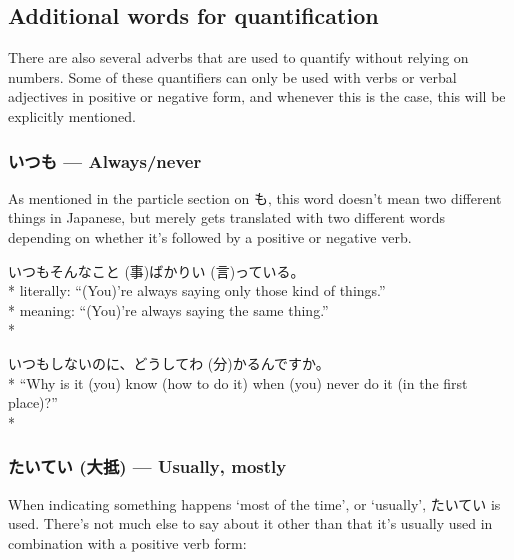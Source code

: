 \documentclass[11pt, b5paper, twoside, openright, onecolumn]{book}
\makeatletter
\newcommand*{\rubystack}[2]{{\relscale{0.5}%
  \begin{tabular}[b]{@{}c@{}}%
    {#1}\\%
   {\textscale{2}{#2}}%
  \end{tabular}}%
}
\DeclareRobustCommand*{\ruby}[2]{%
  \mbox{%
    \setlength{\parskip}{0ex}%
    \BeginAccSupp{method=pdfstringdef,ActualText={#1}}%
      \rubystack{\phantom{#2}}{#1}%
      \llap{%
        \rubystack{#2}{\phantom{#1}}%
      }%
    \EndAccSupp{}%
  }%
}
\renewcommand*{\ruby}[2]{#2 (#1)}%
\newenvironment{exampleblock}{
\setlength{\parindent}{0.6in}
\begin{minipage}[t]{\dimexpr\textwidth-\parindent}}
{\end{minipage}}
\makeatother
\begin{document}
\subsection{Additional words for quantification}

There are also several adverbs that are used to quantify without relying on numbers. Some of these quantifiers can only be used with verbs or verbal adjectives in positive or negative form‚ and whenever this is the case‚ this will be explicitly mentioned.

\subsubsection{いつも — Always/never}

As mentioned in the particle section on も‚ this word doesn’t mean two different things in Japanese‚ but merely gets translated with two different words depending on whether it’s followed by a positive or negative verb.

\vspace{0.4cm}
\begin{exampleblock}
いつもそんな\ruby{事}{こと}ばかり\ruby{言}{い}っている。 \\* 
literally: “(You)’re always saying only those kind of things.” \\* 
meaning: “(You)’re always saying the same thing.” \\* 
\end{exampleblock}
\vspace{0.2cm}

\begin{exampleblock}
いつもしないのに、どうして\ruby{分}{わ}かるんですか。 \\* 
“Why is it (you) know (how to do it) when (you) never do it (in the first place)?” \\* 
\end{exampleblock}
\subsubsection{\ruby{大抵}{たいてい} — Usually‚ mostly}


When indicating something happens ‘most of the time’‚ or ‘usually’‚ たいてい is used. There’s not much else to say about it other than that it’s usually used in combination with a positive verb form:
\end{document}

